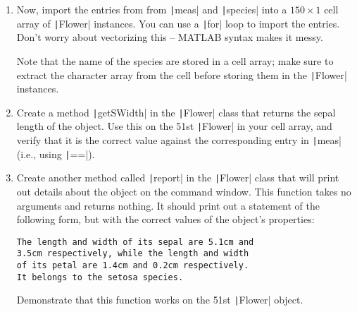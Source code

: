 \documentclass{article}
\begin{document}
\begin{enumerate}
\begin{enumerate}
    \clearpage
  \item Now, import the entries from from \texttt|meas| and \texttt|species| into a $150\times 1$ cell array of \texttt|Flower| instances. You can use a \texttt|for| loop to import the entries. Don't worry about vectorizing this -- MATLAB syntax makes it messy.

    Note that the name of the species are stored in a cell array; make sure to extract the character array from the cell before storing them in the \texttt|Flower| instances.

  \item Create a method \texttt|getSWidth| in the \texttt|Flower| class that returns the sepal length of the object. Use this on the 51st \texttt|Flower| in your cell array, and verify that it is the correct value against the corresponding entry in \texttt|meas| (i.e., using \texttt|==|).

  \item Create another method called \texttt|report| in the \texttt|Flower| class that will print out details about the object on the command window. This function takes no arguments and returns nothing. It should print out a statement of the following form, but with the correct values of the object's properties:
\begin{verbatim}
The length and width of its sepal are 5.1cm and
3.5cm respectively, while the length and width
of its petal are 1.4cm and 0.2cm respectively.
It belongs to the setosa species.
\end{verbatim}
    Demonstrate that this function works on the 51st \texttt|Flower| object.
  \end{enumerate}
\end{enumerate}
\end{document}
